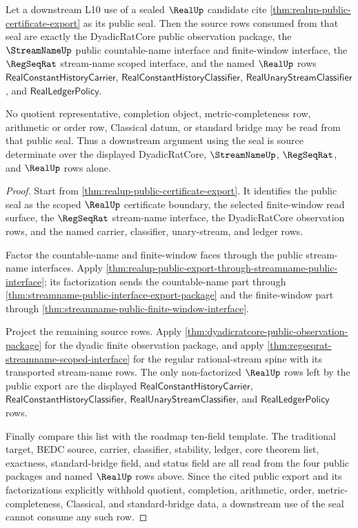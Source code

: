 \begin{theorem}
\label{thm:realup-public-seal-source-determinacy}
Let a downstream L10 use of a sealed $\RealUp$ candidate cite
\autoref{thm:realup-public-certificate-export} as its public seal. Then the
source rows consumed from that seal are exactly the DyadicRatCore public
observation package, the $\StreamNameUp$ public countable-name interface and
finite-window interface, the $\RegSeqRat$ stream-name scoped interface, and the
named $\RealUp$ rows
$\mathsf{RealConstantHistoryCarrier}$,
$\mathsf{RealConstantHistoryClassifier}$,
$\mathsf{RealUnaryStreamClassifier}$, and $\mathsf{RealLedgerPolicy}$.

No quotient representative, completion object, metric-completeness row,
arithmetic or order row, Classical datum, or standard bridge may be read from
that public seal. Thus a downstream argument using the seal is source
determinate over the displayed DyadicRatCore, $\StreamNameUp$, $\RegSeqRat$, and
$\RealUp$ rows alone.
\end{theorem}
\begin{proof}
Start from \autoref{thm:realup-public-certificate-export}. It identifies the
public seal as the scoped $\RealUp$ certificate boundary, the selected
finite-window read surface, the $\RegSeqRat$ stream-name interface, the
DyadicRatCore observation rows, and the named carrier, classifier, unary-stream,
and ledger rows.

Factor the countable-name and finite-window faces through the public stream-name
interfaces. Apply
\autoref{thm:realup-public-export-through-streamname-public-interface}; its
factorization sends the countable-name part through
\autoref{thm:streamname-public-interface-export-package} and the finite-window
part through \autoref{thm:streamname-public-finite-window-interface}.

Project the remaining source rows. Apply
\autoref{thm:dyadicratcore-public-observation-package} for the dyadic finite
observation package, and apply
\autoref{thm:regseqrat-streamname-scoped-interface} for the regular
rational-stream spine with its transported stream-name rows. The only
non-factorized $\RealUp$ rows left by the public export are the displayed
$\mathsf{RealConstantHistoryCarrier}$,
$\mathsf{RealConstantHistoryClassifier}$,
$\mathsf{RealUnaryStreamClassifier}$, and $\mathsf{RealLedgerPolicy}$ rows.

Finally compare this list with the roadmap ten-field template. The traditional
target, BEDC source, carrier, classifier, stability, ledger, core theorem list,
exactness, standard-bridge field, and status field are all read from the four
public packages and named $\RealUp$ rows above. Since the cited public export and
its factorizations explicitly withhold quotient, completion, arithmetic, order,
metric-completeness, Classical, and standard-bridge data, a downstream use of
the seal cannot consume any such row.
\end{proof}

